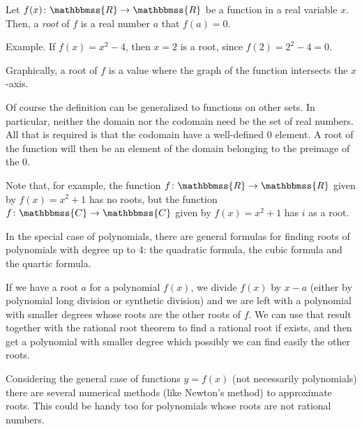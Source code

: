 \documentclass{article}
\newcommand{\C}{\mathbbmss{C}}
\newcommand{\R}{\mathbbmss{R}}
\begin{document}
Let $f(x)\colon\R\rightarrow \R$ be a function in a real variable $x$. Then, a \emph{root} of $f$ is a real number $a$ that $f(a)=0$.

Example. If $f(x)=x^2-4$, then $x=2$ is a root, since $f(2)=2^2-4=0$. 

Graphically, a root of $f$ is a value where the graph of the function intersects the $x$-axis.

Of course the definition can be generalized to functions on other sets. In particular, neither the domain nor the codomain need be the set of real numbers.  All that is required is that the codomain have a well-defined $0$ element.   A root of the function will then be an element of the domain belonging to the preimage of the $0$.

Note that, for example, the function $f\colon\R\to\R$ given by $f(x)=x^2+1$ has no roots, but the function $f\colon\C\to\C$ given by $f(x)=x^2+1$ has $i$ as a root.

In the special case of polynomials, there are general formulas for finding roots of polynomials with degree up to 4: the quadratic formula, the cubic formula and the quartic formula.

If we have a root $a$ for a polynomial $f(x)$, we divide $f(x)$ by $x-a$ (either by polynomial long division or synthetic division) and we are left with a polynomial with smaller degrees whose roots are the other roots of $f$. We can use that result together with the rational root theorem to find a rational root if exists, and then get a polynomial with smaller degree which possibly we can find easily the other roots.

Considering the general case of functions $y=f(x)$ (not necessarily polynomials) there are several numerical methods (like Newton's method) to approximate roots. This could be handy too for polynomials whose roots are not rational numbers.
\end{document}

